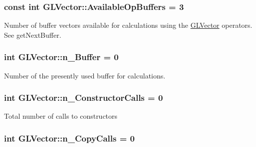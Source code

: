 \label{d4/db1/classGLVector_a95097d48b78403b59733b95ac857656a}
\hypertarget{classGLVector_a6993a627d920674f67b9a616ff2e931f}{
\subsubsection[{\-Available\-Op\-Buffers}]{\setlength{\rightskip}{0pt plus 5cm}const int {\bf \-G\-L\-Vector\-::\-Available\-Op\-Buffers} = 3}}
\label{d4/db1/classGLVector_a6993a627d920674f67b9a616ff2e931f}
\-Number of buffer vectors available for calculations using the \hyperlink{classGLVector}{\-G\-L\-Vector} operators. \-See get\-Next\-Buffer. \hypertarget{classGLVector_a22483a8861e1ab14f4c547092897969f}{
\subsubsection[{n\-\_\-\-Buffer}]{\setlength{\rightskip}{0pt plus 5cm}int {\bf \-G\-L\-Vector\-::n\-\_\-\-Buffer} = 0}}
\label{d4/db1/classGLVector_a22483a8861e1ab14f4c547092897969f}
\-Number of the presently used buffer for calculations. \hypertarget{classGLVector_aa4ac1dd82aca534dee654d1d5c93ed73}{
\subsubsection[{n\-\_\-\-Constructor\-Calls}]{\setlength{\rightskip}{0pt plus 5cm}int {\bf \-G\-L\-Vector\-::n\-\_\-\-Constructor\-Calls} = 0}}
\label{d4/db1/classGLVector_aa4ac1dd82aca534dee654d1d5c93ed73}
\-Total number of calls to constructors \hypertarget{classGLVector_ad399536bb23ff481180e7eb0a92e9de3}{
\subsubsection[{n\-\_\-\-Copy\-Calls}]{\setlength{\rightskip}{0pt plus 5cm}int {\bf \-G\-L\-Vector\-::n\-\_\-\-Copy\-Calls} = 0}}
